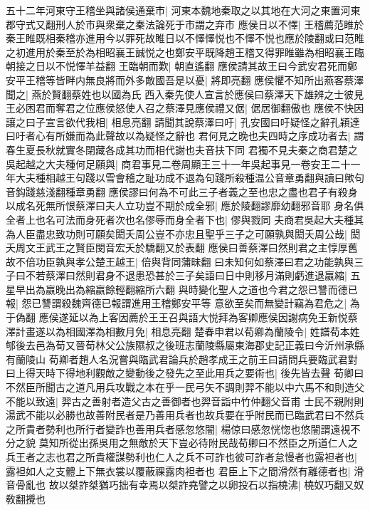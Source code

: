 五十二年河東守王稽坐與諸侯通棄市|{
	河東本魏地秦取之以其地在大河之東置河東郡守式又翻刑人於市與衆棄之秦法論死于市謂之弃市}
應侯日以不懌|{
	王稽薦范睢於秦王睢既相秦稽亦進用今以罪死故睢日以不懌懌悦也不懌不悦也應於陵翻或曰范睢之初進用於秦至於為相昭襄王誠悦之也鄭安平既降趙王稽又得罪睢雖為相昭襄王臨朝接之日以不悦懌羊益翻}
王臨朝而歎|{
	朝直遙翻}
應侯請其故王曰今武安君死而鄭安平王稽等皆畔内無良將而外多敵國吾是以憂|{
	將即亮翻}
應侯懼不知所出燕客蔡澤聞之|{
	燕於賢翻蔡姓也以國為氏}
西入秦先使人宣言於應侯曰蔡澤天下雄辨之士彼見王必困君而奪君之位應侯怒使人召之蔡澤見應侯禮又倨|{
	倨居御翻傲也}
應侯不快因讓之曰子宣言欲代我相|{
	相息亮翻}
請聞其說蔡澤曰吁|{
	孔安國曰吁疑怪之辭孔穎達曰吁者心有所嫌而為此聲故以為疑怪之辭也}
君何見之晚也夫四時之序成功者去|{
	謂春生夏長秋就實冬閉藏各成其功而相代謝也夫音扶下同}
君獨不見夫秦之商君楚之吳起越之大夫種何足願與|{
	商君事見二卷周顯王三十一年吳起事見一卷安王二十一年大夫種相越王句踐以雪會稽之耻功成不退為句踐所殺種温公音章勇翻與讀曰歟句音鈎踐慈淺翻種章勇翻}
應侯謬曰何為不可此三子者義之至也忠之盡也君子有殺身以成名死無所恨蔡澤曰夫人立功豈不期於成全邪|{
	應於陵翻謬靡幼翻邪音耶}
身名俱全者上也名可法而身死者次也名僇辱而身全者下也|{
	僇與戮同}
夫商君吳起大夫種其為人臣盡忠致功則可願矣閎夭周公豈不亦忠且聖乎三子之可願孰與閎夭周公哉|{
	閎夭周文王武王之賢臣閔音宏夭於驕翻又於表翻}
應侯曰善蔡澤曰然則君之主惇厚舊故不倍功臣孰與孝公楚王越王|{
	倍與背同蒲昧翻}
曰未知何如蔡澤曰君之功能孰與三子曰不若蔡澤曰然則君身不退患恐甚於三子矣語曰日中則移月滿則虧進退嬴縮|{
	五星早出為嬴晚出為縮嬴餘輕翻縮所六翻}
與時變化聖人之道也今君之怨已讐而德已報|{
	怨已讐謂殺魏齊德已報謂進用王稽鄭安平等}
意欲至矣而無變計竊為君危之|{
	為于偽翻}
應侯遂延以為上客因薦於王王召與語大悦拜為客卿應侯因謝病免王新悦蔡澤計畫遂以為相國澤為相數月免|{
	相息亮翻}
楚春申君以荀卿為蘭陵令|{
	姓譜荀本姓郇後去邑為荀又晉荀林父公族隰叔之後班志蘭陵縣屬東海郡史記正義曰今沂州承縣有蘭陵山}
荀卿者趙人名況嘗與臨武君論兵於趙孝成王之前王曰請問兵要臨武君對曰上得天時下得地利觀敵之變動後之發先之至此用兵之要術也|{
	後先皆去聲}
荀卿曰不然臣所聞古之道凡用兵攻戰之本在乎一民弓矢不調則羿不能以中六馬不和則造父不能以致遠|{
	羿古之善射者造父古之善御者也羿音詣中竹仲翻父音甫}
士民不親附則湯武不能以必勝也故善附民者是乃善用兵者也故兵要在乎附民而已臨武君曰不然兵之所貴者勢利也所行者變詐也善用兵者感忽悠闇|{
	楊倞曰感忽恍惚也悠闇謂遠視不分之貌}
莫知所從出孫吳用之無敵於天下豈必待附民哉荀卿曰不然臣之所道仁人之兵王者之志也君之所貴權謀勢利也仁人之兵不可詐也彼可詐者怠慢者也露袒者也|{
	露袒如人之支體上下無衣裳以覆蔽祼露肉袒者也}
君臣上下之間滑然有離德者也|{
	滑音骨亂也}
故以桀詐桀猶巧拙有幸焉以桀詐堯譬之以卵投石以指橈沸|{
	橈奴巧翻又奴敎翻攪也}

